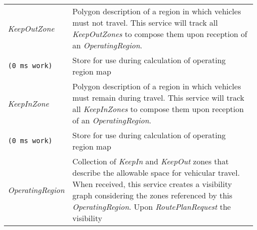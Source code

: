 \begin{longtable}[c]{@{}ll@{}}
\begin{minipage}[t]{0.29\columnwidth}\raggedright\strut
\emph{KeepOutZone}
\strut\end{minipage} &
\begin{minipage}[t]{0.65\columnwidth}\raggedright\strut
Polygon description of a region in which vehicles must not travel. This
service will track all \emph{KeepOutZones} to compose them upon
reception of an \emph{OperatingRegion}.
\strut\end{minipage}\tabularnewline
\begin{minipage}[t]{0.29\columnwidth}\raggedright\strut
\begin{verbatim}
(0 ms work)
\end{verbatim}
\strut\end{minipage} &
\begin{minipage}[t]{0.65\columnwidth}\raggedright\strut
Store for use during calculation of operating region map
\strut\end{minipage}\tabularnewline
\begin{minipage}[t]{0.29\columnwidth}\raggedright\strut
\emph{KeepInZone}
\strut\end{minipage} &
\begin{minipage}[t]{0.65\columnwidth}\raggedright\strut
Polygon description of a region in which vehicles must remain during
travel. This service will track all \emph{KeepInZones} to compose them
upon reception of an \emph{OperatingRegion}.
\strut\end{minipage}\tabularnewline
\begin{minipage}[t]{0.29\columnwidth}\raggedright\strut
\begin{verbatim}
(0 ms work)
\end{verbatim}
\strut\end{minipage} &
\begin{minipage}[t]{0.65\columnwidth}\raggedright\strut
Store for use during calculation of operating region map
\strut\end{minipage}\tabularnewline
\begin{minipage}[t]{0.29\columnwidth}\raggedright\strut
\emph{OperatingRegion}
\strut\end{minipage} &
\begin{minipage}[t]{0.65\columnwidth}\raggedright\strut
Collection of \emph{KeepIn} and \emph{KeepOut} zones that describe the
allowable space for vehicular travel. When received, this service
creates a visibility graph considering the zones referenced by this
\emph{OperatingRegion}. Upon \emph{RoutePlanRequest} the visibility

\end{minipage}
\end{longtable}
